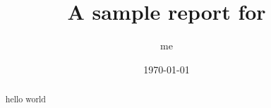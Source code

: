 \documentclass[journal]{IEEEtran}
\title{A sample report for 
}
\author{ me
}
\date{\today}
\begin{document}
\maketitle

\begin{abstract}
  hello world 
\end{abstract}




%
%
\end{document}
